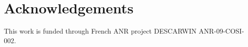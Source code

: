 \documentclass{MYsig-alternate}
\begin{document}
\section{Acknowledgements}
This work is funded through French ANR project DESCARWIN ANR-09-COSI-002.




\end{document}
